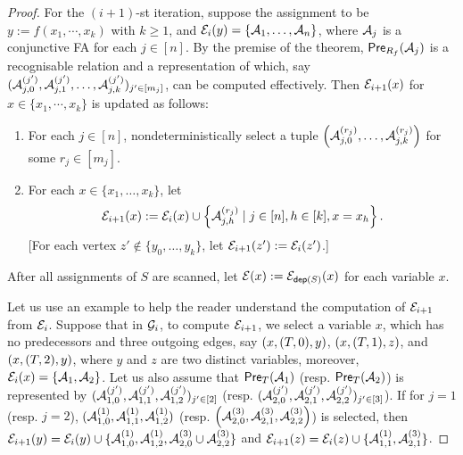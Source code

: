 \begin{proof}
For the $(i+1)$-st iteration, suppose the assignment to be $y:= f(x_1, \cdots, x_k)$ with $k\geq 1$, and  $\mathcal{E}_i(y)=\{\mathcal{A}_1, \ldots, \mathcal{A}_n\}$, 
where $\mathcal{A}_j$ is a conjunctive FA for each $j \in [n]$.
By the premise of the theorem, $\textsf{Pre}_{R_f}(\mathcal{A}_j)$ is a recognisable relation and a representation of which, say $(\mathcal{A}^{(j')}_{j, 0}, \mathcal{A}^{(j')}_{j, 1}, \ldots, \mathcal{A}^{(j')}_{j, k})_{ j'  \in [m_j]}$, can be computed effectively.
Then $\mathcal{E}_{i+1}(x)$ for $x \in  \{x_1,\cdots, x_k\}$ is updated as follows: %
\begin{enumerate}
\item For each $j \in [n]$, nondeterministically select a tuple $\left(\mathcal{A}^{(r_j)}_{j, 0}, \ldots, \mathcal{A}^{(r_j)}_{j, k}\right)$ for some $r_j \in [m_j]$.
%
\item For each $x \in \{x_1,\ldots, x_k\}$, let
\[
    \mathcal{E}_{i+1}(x):= \mathcal{E}_{i}(x) \cup \left\{\mathcal{A}^{(r_j)}_{j, h} \mid  j \in [n], h \in [k], x = x_h \right\}.
\]
[For each vertex $z'  {\notin} \{y_0,\ldots, y_k\}$, let $\mathcal{E}_{i+1}(z') := \mathcal{E}_i(z')$.]
%
\end{enumerate}
%
After all assignments of $S$ are scanned,  let $\mathcal{E}(x):=\mathcal{E}_{\mathsf{dep}(S)}(x)$ for each variable $x$.

Let us use an example to help the reader understand the computation of $\mathcal{E}_{i+1}$ from $\mathcal{E}_i$.  Suppose that in $\mathcal{G}_i$, to compute $\mathcal{E}_{i+1}$, we select a variable $x$, which has no predecessors and three outgoing edges, say $(x, (T, 0), y)$, $(x, (T, 1), z)$, and $(x, (T, 2), y)$, where $y$ and $z$ are two distinct variables, moreover, $\mathcal{E}_i(x) = \{\mathcal{A}_1, \mathcal{A}_2\}$. Let us also assume that  $\textsf{Pre}_{T}(\mathcal{A}_1)$ (resp. $\textsf{Pre}_{T}(\mathcal{A}_2)$) is represented by $(\mathcal{A}^{(j')}_{1, 0}, \mathcal{A}^{(j')}_{1, 1}, \mathcal{A}^{(j')}_{1, 2})_{ j'  \in [2]}$ (resp. $(\mathcal{A}^{(j')}_{2, 0}, \mathcal{A}^{(j')}_{2, 1}, \mathcal{A}^{(j')}_{2, 2})_{ j'  \in [3]}$). If for $j = 1$ (resp. $j=2$), $(\mathcal{A}^{(1)}_{1, 0}, \mathcal{A}^{(1)}_{1, 1}, \mathcal{A}^{(1)}_{1, 2})$  (resp. $\left(\mathcal{A}^{(3)}_{2, 0}, \mathcal{A}^{(3)}_{2, 1}, \mathcal{A}^{(3)}_{2, 2}\right)$)  is selected, then $\mathcal{E}_{i+1}(y) = \mathcal{E}_i(y) \cup \{\mathcal{A}^{(1)}_{1, 0}, \mathcal{A}^{(1)}_{1, 2}, \mathcal{A}^{(3)}_{2, 0} \cup \mathcal{A}^{(3)}_{2, 2}\}$ and $\mathcal{E}_{i+1}(z) = \mathcal{E}_{i}(z) \cup \{\mathcal{A}^{(1)}_{1, 1}, \mathcal{A}^{(3)}_{2, 1}\}$. 


\end{proof}
